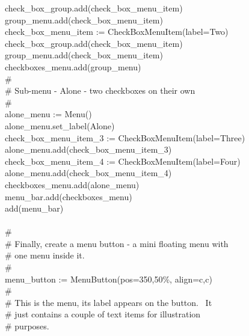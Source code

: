 {\>   \ \ \ check\_box\_group.add(check\_box\_menu\_item) \\
\>   \ \ \ group\_menu.add(check\_box\_menu\_item) \\
\>   \ \ \ check\_box\_menu\_item :=
CheckBoxMenuItem({\textquotedbl}label=Two{\textquotedbl}) \\
\>   \ \ \ check\_box\_group.add(check\_box\_menu\_item) \\
\>   \ \ \ group\_menu.add(check\_box\_menu\_item) \\
\>   \ \ \ checkboxes\_menu.add(group\_menu) \\
\>   \ \ \ \# \\
\>   \ \ \ \# Sub-menu - {\textquotedbl}Alone{\textquotedbl} - two
checkboxes on their own \\
\>   \ \ \ \# \\
\>   \ \ \ alone\_menu := Menu() \\
\>   \ \ \ alone\_menu.set\_label({\textquotedbl}Alone{\textquotedbl}) \\
\>   \ \ \ check\_box\_menu\_item\_3 :=
CheckBoxMenuItem({\textquotedbl}label=Three{\textquotedbl}) \\
\>   \ \ \ alone\_menu.add(check\_box\_menu\_item\_3) \\
\>   \ \ \ check\_box\_menu\_item\_4 :=
CheckBoxMenuItem({\textquotedbl}label=Four{\textquotedbl}) \\
\>   \ \ \ alone\_menu.add(check\_box\_menu\_item\_4) \\
\>   \ \ \ checkboxes\_menu.add(alone\_menu) \\
\>   \ \ \ menu\_bar.add(checkboxes\_menu) \\
\>   \ \ \ add(menu\_bar) \\
\ \\
\>   \ \ \ \# \\
\>   \ \ \ \# Finally, create a menu button - a mini floating menu with \\
\>   \ \ \ \# one menu inside it. \\
\>   \ \ \ \# \\
\>   \ \ \ menu\_button :=
MenuButton({\textquotedbl}pos=350,50\%{\textquotedbl},
{\textquotedbl}align=c,c{\textquotedbl}) \\
\>   \ \ \ \# \\
\>   \ \ \ \# This is the menu, its label appears on the button. \ It \\
\>   \ \ \ \# just contains a couple of text items for illustration \\
\>   \ \ \ \# purposes. \\
}

